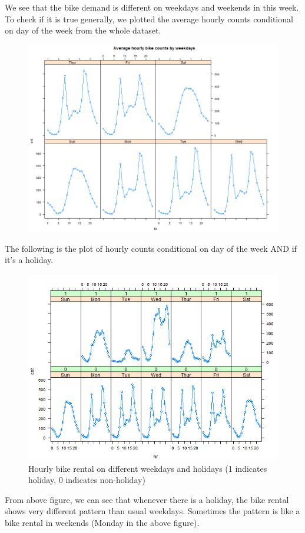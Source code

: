 \documentclass[12pt]{article}
\begin{document}
	We see that the bike demand is different on weekdays and weekends in this week. To check if it is true generally, we plotted the average hourly counts conditional on day of the week from the whole dataset.
	\begin{figure}[H]
		\centering
		\includegraphics[scale=.6]{figures/hr_weekday.png}
	\end{figure}
	
	The following is the plot of hourly counts conditional on day of the week AND if it's a holiday.
		\begin{figure}[H]
			\centering
			\includegraphics[scale=1]{figures/hr_weekday_holiday.png}
			\caption{Hourly bike rental on different weekdays and holidays (1 indicates holiday, 0 indicates non-holiday)}
		\end{figure}
	From above figure, we can see that whenever there is a holiday, the bike rental shows very different pattern than usual weekdays.  Sometimes the pattern is like a bike rental in weekends (Monday in the above figure).
	
\end{document}
